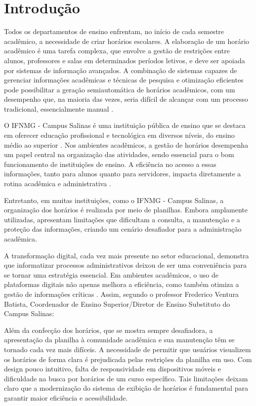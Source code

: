 \chapter{Introdução} 
\label{cap1_introducao} 

Todos os departamentos de ensino enfrentam, no início de cada semestre acadêmico, a necessidade de criar horários escolares. A elaboração de um horário acadêmico é uma tarefa complexa, que envolve a gestão de restrições entre alunos, professores e salas em determinados períodos letivos, e deve ser apoiada por sistemas de informação avançados. A combinação de sistemas capazes de gerenciar informações acadêmicas e técnicas de pesquisa e otimização eficientes pode possibilitar a geração semiautomática de horários acadêmicos, com um desempenho que, na maioria das vezes, seria difícil de alcançar com um processo tradicional, essencialmente manual \cite{passos2016}.

O IFNMG - Campus Salinas é uma instituição pública de ensino que se destaca em oferecer educação profissional e tecnológica em diversos níveis, do ensino médio ao superior \cite{ifnmgsalinas2014}. Nos ambientes acadêmicos, a gestão de horários desempenha um papel central na organização das atividades, sendo essencial para o bom funcionamento de instituições de ensino. A eficiência no acesso a essas informações, tanto para alunos quanto para servidores, impacta diretamente a rotina acadêmica e administrativa \cite{Urania2024}. 

Entretanto, em muitas instituições, como o IFNMG - Campus Salinas, a organização dos horários é realizada por meio de planilhas. Embora amplamente utilizadas, apresentam limitações que dificultam a consulta, a manutenção e a proteção das informações, criando um cenário desafiador para a administração acadêmica.

A transformação digital, cada vez mais presente no setor educacional, demonstra que informatizar processos administrativos deixou de ser uma conveniência para se tornar uma estratégia essencial. Em ambientes acadêmicos, o uso de plataformas digitais não apenas melhora a eficiência, como também otimiza a gestão de informações críticas \cite{Educacional2023}. Assim, segundo o professor Frederico Ventura Batista, Coordenador de Ensino Superior/Diretor de Ensino Substituto do Campus Salinas:

\begin{citacao}
Além da confecção dos horários, que se mostra sempre desafiadora, a apresentação da planilha à comunidade acadêmica e sua manutenção têm se tornado cada vez mais difíceis. A necessidade de permitir que usuários visualizem os horários de forma clara é prejudicada pelas restrições da planilha em uso. Com design pouco intuitivo, falta de responsividade em dispositivos móveis e dificuldade na busca por horários de um curso específico. Tais limitações deixam claro que a modernização do sistema de exibição de horários é fundamental para garantir maior eficiência e acessibilidade.
\end{citacao}

